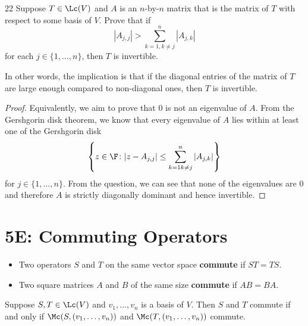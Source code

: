 \documentclass{extarticle}
\begin{document}
\begin{problem}{22}
    Suppose \(T \in \Lc(V)\) and \(A\) is an \(n\)-by-\(n\) matrix that is the matrix of \(T\) with respect to some 
    basis of \(V\). Prove that if 
    \[|A_{j,j}| > \sum_{k=1, k\neq j}^{n} |A_{j,k}|\] 
    for each \(j \in \{1, \ldots, n\}\), then \(T\) is invertible. 

    In other words, the implication is that if the diagonal entries of the matrix of \(T\) are large enough 
    compared to non-diagonal ones, then \(T\) is invertible. 
\end{problem}

\begin{proof}
Equivalently, we aim to prove that 0 is not an eigenvalue of \(A\). From the Gershgorin disk theorem, we know 
that every eigenvalue of \(A\) lies within at least one of the Gershgorin disk 
\[\left\{z \in \F \colon |z - A_{j,j}| \leq \sum_{k=1 k \neq j }^{n} |A_{j,k}|\right\}\]
for \(j \in \{1, \ldots, n\}\). From the question, we can see that none of the eigenvalues are 0 and therefore 
\(A\) is strictly diagonally dominant and hence invertible. 
\end{proof}


\newpage 
\section*{5E: Commuting Operators}

\begin{definition}[commute]
    \begin{itemize}
        \item Two operators \(S\) and \(T\) on the same vector space \textbf{commute} if \(ST = TS\).
        \item Two square matrices \(A\) and \(B\) of the same size \textbf{commute} if \(AB = BA\).
    \end{itemize}
\end{definition}

\begin{lemma}
    Suppose \(S, T \in \Lc(V)\) and \(v_1, \ldots, v_n\) is a basis of \(V\). Then \(S\) and \(T\)
    commute if and only if \(\Mc(S, (v_1, \ldots, v_n))\) and \(\Mc(T, (v_1, \ldots, v_n))\) commute.
\end{lemma}
\end{document}
